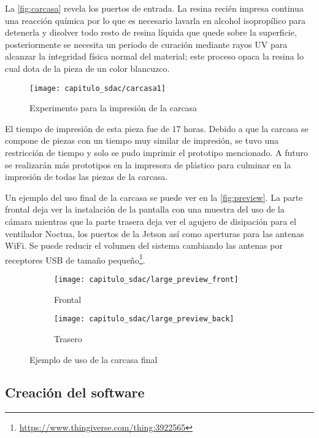 La \autoref{fig:carcasa} revela los puertos de entrada. La resina recién impresa
continua una reacción química por lo que es necesario lavarla en alcohol
isopropílico para detenerla y disolver todo resto de resina líquida que quede
sobre la superficie, posteriormente se necesita un periodo de curación mediante
rayos UV para alcanzar la integridad física normal del material; este proceso
opaca la resina lo cual dota de la pieza de un color blancuzco.

\begin{figure}[H]
    \centering
    \texttt{[image: capitulo\_sdac/carcasa1]}
    \caption{Experimento para la impresión de la carcasa}\label{fig:carcasa}
\end{figure}

El tiempo de impresión de esta pieza fue de 17 horas. Debido a que la carcasa se
compone de piezas con un tiempo muy similar de impresión, se tuvo una
restricción de tiempo y solo se pudo imprimir el prototipo mencionado. A futuro
se realizarán más prototipos en la impresora de plástico para culminar en la
impresión de todas las piezas de la carcasa.

Un ejemplo del uso final de la carcasa se puede ver en la \autoref{fig:preview}.
La parte frontal deja ver la instalación de la pantalla con una muestra del uso
de la cámara mientras que la parte trasera deja ver el agujero de disipación
para el ventilador Noctua, los puertos de la Jetson así como aperturas para las
antenas WiFi. Se puede reducir el volumen del sistema cambiando las antenas por
receptores USB de tamaño
pequeño\footnote{\url{https://www.thingiverse.com/thing:3922565}}.

\begin{figure}[H]
    \centering
    \begin{subfigure}{.5\textwidth}
        \centering
        \texttt{[image: capitulo\_sdac/large\_preview\_front]}
        \caption{Frontal}
    \end{subfigure}%
    \begin{subfigure}{.5\textwidth}
        \centering
        \texttt{[image: capitulo\_sdac/large\_preview\_back]}
        \caption{Trasero}
    \end{subfigure}
    \caption{Ejemplo de uso de la carcasa final}\label{fig:preview}
\end{figure}

\subsection{Creación del software}

